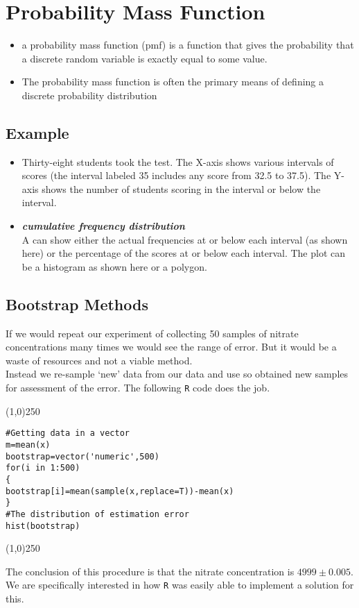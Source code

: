 \section{Probability Mass Function}
\begin{itemize} \item a probability mass function (pmf) is a function that gives the probability that a discrete random variable is exactly equal to some value. \item The probability mass function is often the primary means of defining a discrete probability distribution \end{itemize}
\subsection{Example}
\begin{itemize}
	\item Thirty-eight students took the test. The X-axis shows various intervals of scores (the interval labeled 35 includes any score from 32.5 to 37.5). The Y-axis shows the number of students scoring in the interval or below the interval.
	
	\item \textbf{\emph{cumulative frequency distribution}} \\A  can show either the actual frequencies at or below each interval (as shown here) or the percentage of the scores at or below each interval. The plot can be a histogram as shown here or a polygon.
\end{itemize}


\subsection{Bootstrap Methods}
If we would repeat our experiment of collecting 50 samples of nitrate concentrations many times we would see the range of error. But it would be a waste of resources and not a viable method.\\
Instead we re-sample `new' data from our data and use so obtained new samples for assessment of the error.
The following \texttt{R} code does the job.
\begin{center}
	\line(1,0){250}
\end{center}
\begin{verbatim}
#Getting data in a vector
m=mean(x)
bootstrap=vector('numeric',500)
for(i in 1:500)
{
bootstrap[i]=mean(sample(x,replace=T))-mean(x)
}
#The distribution of estimation error
hist(bootstrap)
\end{verbatim}
\begin{center}
	\line(1,0){250}
\end{center}
The conclusion of this procedure is that the nitrate concentration is $4999 \pm 0.005$. We are specifically interested in how \texttt{R} was easily able to implement a solution for this.
\newpage
